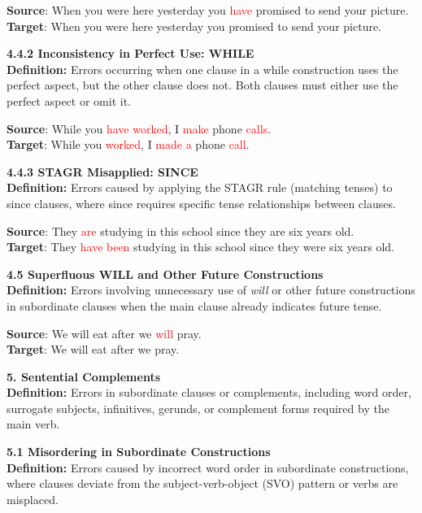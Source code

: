\begin{tcolorbox}[breakable]
\textbf{Source}: When you were here yesterday you \textcolor{red}{have} promised to send your picture. \\
\textbf{Target}: When you were here yesterday you promised to send your picture.


\noindent \textbf{4.4.2 Inconsistency in Perfect Use: WHILE}\\
\textbf{Definition:} Errors occurring when one clause in a while construction uses the perfect aspect, but the other clause does not. Both clauses must either use the perfect aspect or omit it.


\textbf{Source}: While you \textcolor{red}{have worked}, I \textcolor{red}{make} phone \textcolor{red}{calls}. \\
\textbf{Target}: While you \textcolor{red}{worked}, I \textcolor{red}{made a} phone \textcolor{red}{call}.


\noindent \textbf{4.4.3 STAGR Misapplied: SINCE}\\
\textbf{Definition:} Errors caused by applying the STAGR rule (matching tenses) to since clauses, where since requires specific tense relationships between clauses.


\textbf{Source}: They \textcolor{red}{are} studying in this school since they are six years old. \\
\textbf{Target}: They \textcolor{red}{have been} studying in this school since they were six years old.


\noindent \textbf{4.5 Superfluous WILL and Other Future Constructions}\\
\textbf{Definition:} Errors involving unnecessary use of \textit{will} or other future constructions in subordinate clauses when the main clause already indicates future tense.


\textbf{Source}: We will eat after we \textcolor{red}{will} pray. \\
\textbf{Target}: We will eat after we pray.



\noindent \textbf{5. Sentential Complements}\\
\textbf{Definition:} Errors in subordinate clauses or complements, including word order, surrogate subjects, infinitives, gerunds, or complement forms required by the main verb.

\noindent \textbf{5.1 Misordering in Subordinate Constructions}\\
\textbf{Definition:} Errors caused by incorrect word order in subordinate constructions, where clauses deviate from the subject-verb-object (SVO) pattern or verbs are misplaced.



\end{tcolorbox}
